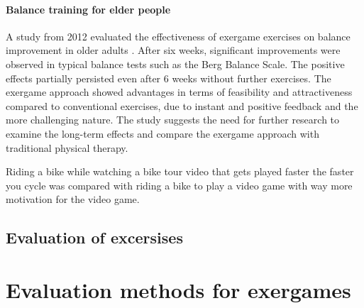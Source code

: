 \subsubsection{Balance training for elder people}
A study from 2012 evaluated the effectiveness of exergame exercises on balance improvement in older adults \cite{lai2013effects}. After six weeks, significant improvements were observed in typical balance tests such as the Berg Balance Scale. The positive effects partially persisted even after 6 weeks without further exercises. The exergame approach showed advantages in terms of feasibility and attractiveness compared to conventional exercises, due to instant and positive feedback and the more challenging nature. The study suggests the need for further research to examine the long-term effects and compare the exergame approach with traditional physical therapy.

Riding a bike while watching a bike tour video that gets played faster the faster you cycle was compared with riding a bike to play a video game with way more motivation for the video game. \cite{hardy2011adoption}


\section{Evaluation of excersises}


\chapter{Evaluation methods for exergames}



	
